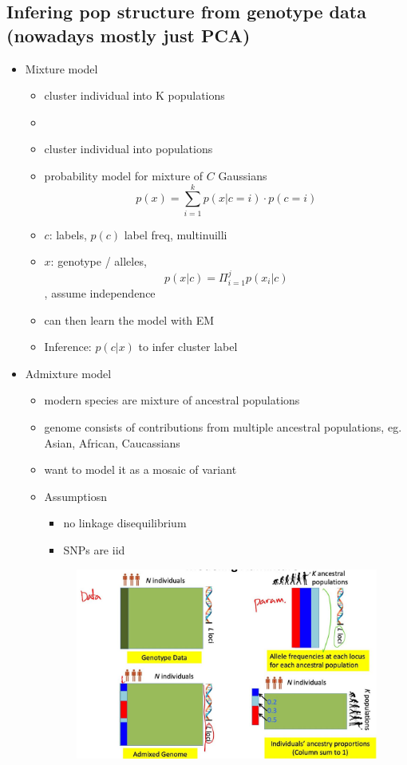 \documentclass[font=12pt]{article}
\begin{document}
\subsection{Infering pop structure from genotype data (nowadays mostly just PCA)}
\begin{itemize}
	\item Mixture model 
	\begin{itemize}
		\item cluster individual into K populations
		\item {}
		\item cluster individual into populations
		\item probability model for mixture of $ C $ Gaussians
		\[ p(x) = \sum_{i=1}^k p(x|c=i)\cdot p(c=i)\]
		\item $ c $: labels, $ p(c) $ label freq, multinuilli
		\item $ x $: genotype / alleles, $$ p(x|c) = \Pi_{i=1}^j p(x_i|c)$$ , assume independence
		\item can then learn the model with EM
		\item Inference: $p(c|x)$ to infer cluster label
	\end{itemize}
	\item Admixture model
	\begin{itemize}
		\item modern species are mixture of ancestral populations
		\item genome consists of contributions from multiple ancestral populations, eg. Asian, African, Caucassians
		\item want to model it as a mosaic of variant
		\item Assumptiosn
		\begin{itemize}
			\item no linkage disequilibrium
			\item SNPs are iid
		\end{itemize}
		\begin{figure}[h!]
			\centering
			\includegraphics[scale = 0.2]{"admixture.jpg"}

\end{figure}
\end{itemize}
\end{itemize}
\end{document}

